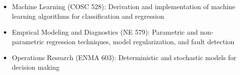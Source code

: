 
\begin{itemize}
\item Machine Learning (COSC 528): Derivation and implementation of machine learning algorithms for classification and regression
\item Emprical Modeling and Diagnostics (NE 579): Parametric and non-parametric regression techniques, model regularization, and fault detection
\item Operations Research (ENMA 603): Deterministic and stochastic models for decision making
\end{itemize}

